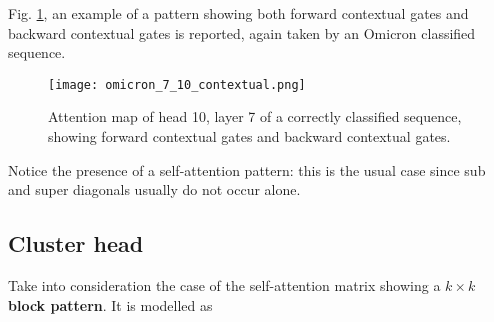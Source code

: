 \documentclass[11pt,a4paper,reqno]{amsart} %
\theoremstyle{definition}
\numberwithin{equation}{section}          %
\begin{document}
Fig. \ref{fig:omicron_7_10_contextual}, an example of a pattern showing both forward contextual gates and backward contextual gates is reported, again taken by an Omicron classified sequence.

\begin{figure}[h!]
    \centering
    {\texttt{[image: omicron\_7\_10\_contextual.png]}}
    \caption{Attention map of head 10, layer 7 of a correctly classified sequence, showing forward contextual gates and backward contextual gates.}
    \label{fig:omicron_7_10_contextual}
\end{figure}
Notice the presence of a self-attention pattern: this is the usual case since sub and super diagonals usually do not occur alone.

\subsection{Cluster head}
Take into consideration the case of the self-attention matrix showing a \textbf{$k \times k$ block pattern}. It is modelled as
\end{document}
